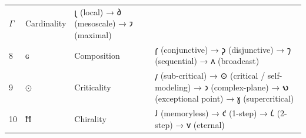 \documentclass[12pt,a4paper]{article}
\begin{document}
\begin{longtable}[]{@{}llll@{}}
\begin{minipage}[t]{0.24\columnwidth}
\(Γ\)\strut
\end{minipage} & \begin{minipage}[t]{0.13\columnwidth}\raggedright
Cardinality\strut
\end{minipage} & \begin{minipage}[t]{0.44\columnwidth}\raggedright
𐑚 (local) → 𐑔 (mesoscale) → 𐑲 (maximal)\strut
\end{minipage}\tabularnewline
\begin{minipage}[t]{0.07\columnwidth}\raggedright
8\strut
\end{minipage} & \begin{minipage}[t]{0.24\columnwidth}\raggedright
\(ɢ\)\strut
\end{minipage} & \begin{minipage}[t]{0.13\columnwidth}\raggedright
Composition\strut
\end{minipage} & \begin{minipage}[t]{0.44\columnwidth}\raggedright
𐑝 (conjunctive) → 𐑜 (disjunctive) → 𐑠 (sequential) → 𐑵 (broadcast)\strut
\end{minipage}\tabularnewline
\begin{minipage}[t]{0.07\columnwidth}\raggedright
9\strut
\end{minipage} & \begin{minipage}[t]{0.24\columnwidth}\raggedright
\(⊙\)\strut
\end{minipage} & \begin{minipage}[t]{0.13\columnwidth}\raggedright
Criticality\strut
\end{minipage} & \begin{minipage}[t]{0.44\columnwidth}\raggedright
𐑢 (sub-critical) → ⊙ (critical / self-modeling) → 𐑮 (complex-plane) → 𐑻
(exceptional point) → 𐑣 (supercritical)\strut
\end{minipage}\tabularnewline
\begin{minipage}[t]{0.07\columnwidth}\raggedright
10\strut
\end{minipage} & \begin{minipage}[t]{0.24\columnwidth}\raggedright
\(Ħ\)\strut
\end{minipage} & \begin{minipage}[t]{0.13\columnwidth}\raggedright
Chirality\strut
\end{minipage} & \begin{minipage}[t]{0.44\columnwidth}\raggedright
𐑓 (memoryless) → 𐑒 (1-step) → 𐑖 (2-step) → 𐑫 (eternal)\strut
\end{minipage}\tabularnewline

\end{longtable}
\end{document}
